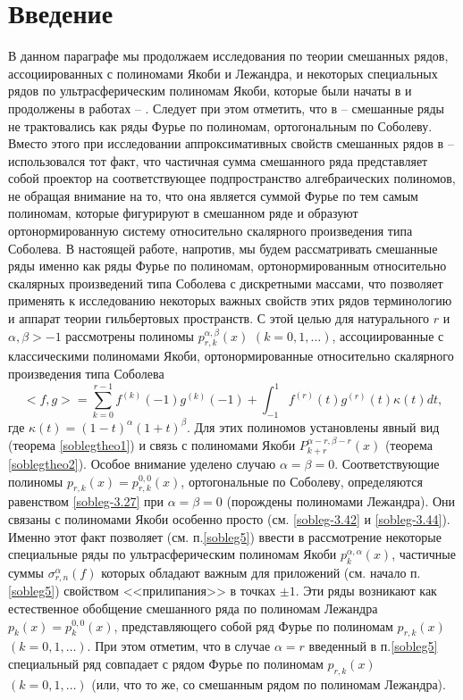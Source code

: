 \section{Введение}
В данном параграфе мы продолжаем исследования по теории смешанных рядов, ассоциированных с  полиномами Якоби и Лежандра, и  некоторых специальных рядов по ультрасферическим полиномам Якоби, которые были начаты в \cite{Shar11} и продолжены в работах
\cite{Shar12} -- \cite{sharap3}.  Следует при этом отметить, что  в \cite{Shar11} -- \cite{sharap3} смешанные ряды не трактовались как ряды Фурье по полиномам, ортогональным по Соболеву. Вместо этого при исследовании аппроксимативных свойств смешанных рядов в \cite{Shar11} -- \cite{sharap3} использовался тот факт, что  частичная сумма смешанного ряда представляет собой проектор на соответствующее подпространство алгебраических полиномов, не обращая внимание на то, что она является суммой Фурье по тем самым полиномам, которые фигурируют в смешанном ряде и образуют ортонормированную систему относительно скалярного произведения типа Соболева. В настоящей работе, напротив,  мы будем рассматривать смешанные ряды именно как ряды Фурье по полиномам, ортонормированным относительно скалярных произведений типа Соболева с дискретными массами, что позволяет применять к исследованию некоторых важных свойств этих рядов  терминологию и аппарат теории гильбертовых пространств. С этой целью для  натурального $r$ и $\alpha,\beta>-1$ рассмотрены полиномы $p^{\alpha,\beta}_{r,k}(x)$ $(k=0,1,\ldots)$, ассоциированные с  классическими полиномами Якоби, ортонормированные относительно скалярного произведения типа Соболева
\begin{equation}\label{sobleg-1.1}
<f,g>=\sum_{k=0}^{r-1}f^{(k)}(-1)g^{(k)}(-1)+\int_{-1}^1 f^{(r)}(t)g^{(r)}(t)\kappa(t)dt,
\end{equation}
где $\kappa(t)=(1-t)^\alpha(1+t)^\beta$. Для этих полиномов установлены явный вид (теорема \ref{soblegtheo1})  и связь с полиномами Якоби $P_{k+r}^{\alpha-r,\beta-r}(x)$ (теорема \ref{soblegtheo2}).  Особое внимание уделено случаю $\alpha=\beta=0$. Соответствующие полиномы $p_{r,k}(x)=p^{0,0}_{r,k}(x)$, ортогональные по Соболеву, определяются равенством \eqref{sobleg-3.27} при $\alpha=\beta=0$ (порождены полиномами Лежандра). Они связаны с полиномами Якоби особенно просто (см.  \eqref{sobleg-3.42} и \eqref{sobleg-3.44}). Именно этот факт позволяет   (см. п.\ref{sobleg5}) ввести в рассмотрение некоторые специальные ряды по ультрасферическим полиномам Якоби $p_k^{\alpha,\alpha}(x)$, частичные суммы $\sigma_{r,n}^\alpha(f)$ которых обладают важным для приложений (см. начало п.\ref{sobleg5}) свойством <<прилипания>> в точках $\pm1$. Эти ряды возникают как естественное обобщение смешанного ряда по полиномам Лежандра $p_k(x)=p_k^{0,0}(x)$, представляющего собой ряд Фурье  по полиномам $p_{r,k}(x)$  $(k=0,1,\ldots)$. При этом отметим, что в случае $\alpha=r$ введенный в п.\ref{sobleg5} специальный ряд совпадает с рядом Фурье по полиномам $p_{r,k}(x)$  $(k=0,1,\ldots)$ (или, что то же, со смешанным рядом по полиномам Лежандра).
